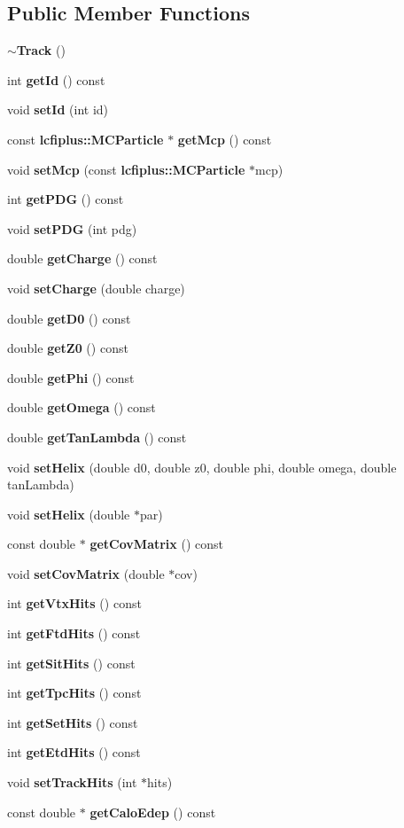 \subsection*{Public Member Functions}
\begin{DoxyCompactItemize}
\item 
\textbf{ $\sim$\+Track} ()
\item 
int \textbf{ get\+Id} () const
\item 
void \textbf{ set\+Id} (int id)
\item 
const \textbf{ lcfiplus\+::\+M\+C\+Particle} $\ast$ \textbf{ get\+Mcp} () const
\item 
void \textbf{ set\+Mcp} (const \textbf{ lcfiplus\+::\+M\+C\+Particle} $\ast$mcp)
\item 
int \textbf{ get\+P\+DG} () const
\item 
void \textbf{ set\+P\+DG} (int pdg)
\item 
double \textbf{ get\+Charge} () const
\item 
void \textbf{ set\+Charge} (double charge)
\item 
double \textbf{ get\+D0} () const
\item 
double \textbf{ get\+Z0} () const
\item 
double \textbf{ get\+Phi} () const
\item 
double \textbf{ get\+Omega} () const
\item 
double \textbf{ get\+Tan\+Lambda} () const
\item 
void \textbf{ set\+Helix} (double d0, double z0, double phi, double omega, double tan\+Lambda)
\item 
void \textbf{ set\+Helix} (double $\ast$par)
\item 
const double $\ast$ \textbf{ get\+Cov\+Matrix} () const
\item 
void \textbf{ set\+Cov\+Matrix} (double $\ast$cov)
\item 
int \textbf{ get\+Vtx\+Hits} () const
\item 
int \textbf{ get\+Ftd\+Hits} () const
\item 
int \textbf{ get\+Sit\+Hits} () const
\item 
int \textbf{ get\+Tpc\+Hits} () const
\item 
int \textbf{ get\+Set\+Hits} () const
\item 
int \textbf{ get\+Etd\+Hits} () const
\item 
void \textbf{ set\+Track\+Hits} (int $\ast$hits)
\item 
const double $\ast$ \textbf{ get\+Calo\+Edep} () const

\end{DoxyCompactItemize}
